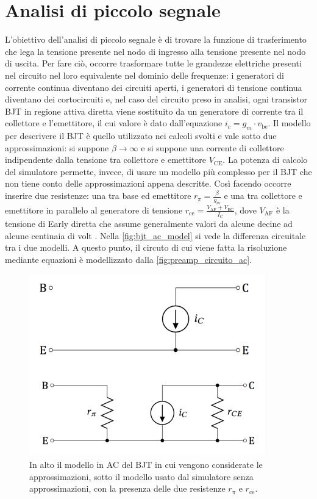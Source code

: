 \section{Analisi di piccolo segnale}
L'obiettivo dell'analisi di piccolo segnale è di trovare la funzione di trasferimento che lega la tensione presente nel nodo di ingresso 
alla tensione presente nel nodo di uscita. Per fare ciò, occorre trasformare tutte le grandezze elettriche
presenti nel circuito nel loro equivalente nel dominio delle frequenze: i generatori di corrente continua diventano dei circuiti aperti,
i generatori di tensione continua diventano dei cortocircuiti e, nel caso del circuito preso in analisi, ogni transistor BJT in regione attiva diretta
viene sostituito da un generatore di corrente tra il collettore e l'emettitore, il cui valore è dato dall'equazione $i_c=g_m \cdot v_\text{be}$.
Il modello per descrivere il BJT è quello utilizzato nei calcoli svolti e vale sotto due approssimazioni: si suppone $\beta\to \infty$ e si suppone 
una corrente di collettore indipendente dalla tensione tra collettore e emettitore $V_\text{CE}$. La potenza di calcolo del simulatore permette, 
invece, di usare un modello più complesso per il BJT che non tiene conto delle approssimazioni appena descritte. Così facendo occorre inserire due 
resistenze: una tra base ed emettitore $r_\pi=\frac{\beta}{g_m}$ e una tra collettore e emettitore in parallelo al generatore di 
tensione $r_\text{ce}=\frac{V_\text{AF}+V_\text{BC}}{I_C}$, dove $V_\text{AF}$ è la tensione di Early diretta che assume generalmente valori da 
alcune decine ad alcune centinaia di volt \cite{graffi_2007_transistori}. Nella \autoref*{fig:bjt_ac_model} si vede la differenza circuitale tra i due modelli. A questo punto, il circuto di cui 
viene fatta la risoluzione mediante equazioni è modellizzato dalla \autoref*{fig:preamp_circuito_ac}.
\begin{figure}[h!]
    \centering
    \includegraphics[width=.65\linewidth]{img/bjt_ac_model.png}
    \caption{In alto il modello in AC del BJT in cui vengono considerate le approssimazioni, sotto il modello usato dal simulatore senza
     approssimazioni, con la presenza delle due resistenze $r_\pi$ e $r_\text{ce}$.}
    \label{fig:bjt_ac_model}
\end{figure}
